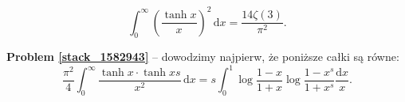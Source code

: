 %

\begin{problem_with_solution}[pytanie 1582943]
    \label{stack_1582943}%
    \begin{equation}
        \int_0^\infty \left(\frac{\tanh x}{x}\right)^2 \,\mathrm{d}x = \frac{14 \zeta (3)}{\pi^2}.
    \end{equation}
\end{problem_with_solution}

\textbf{Problem \ref{stack_1582943}} -- dowodzimy najpierw, że poniższe całki są równe:
\begin{equation}
    \frac{\pi^2}{4} \int_0^\infty \frac{\tanh x \cdot \tanh xs}{x^2} \,\mathrm{d}x = s \int_0^1 \log \frac{1-x}{1+x} \log \frac{1-x^s}{1+x^s} \frac{\mathrm{d}x}{x}.
\end{equation}

%